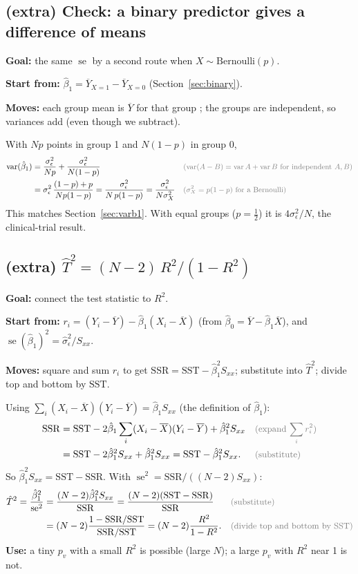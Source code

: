 \documentclass[11pt]{article}
\newcommand{\Var}{\operatorname{var}}
\newcommand{\se}{\operatorname{se}}
\newcommand{\Bern}{\text{Bernoulli}}
\newcommand{\SSR}{\mathrm{SSR}}
\newcommand{\SST}{\mathrm{SST}}
\newcommand{\Ybar}{\overline{Y}}
\newcommand{\Xbar}{\overline{X}}
\newcommand{\why}[1]{&&\text{\small\color{gray}(#1)}}
\newcommand{\mv}[1]{\tcbox[on line, colback=methodclr, colframe=methodclr, coltext=white, boxsep=0pt,
  left=2pt, right=2pt, top=1pt, bottom=1pt, arc=1.5pt]{\sffamily\scriptsize\bfseries M#1}}
\newcommand{\goal}[1]{\textbf{Goal:} #1\par}
\newcommand{\start}[1]{\textbf{Start from:} #1\par}
\newcommand{\moves}[1]{\textbf{Moves:} #1\par}
\begin{document}
\subsection{(extra) Check: a binary predictor gives a difference of means}\label{sec:binarycheck}
\begin{methodbox}
\goal{the same $\se$ by a second route when $X\sim\Bern(p)$.}
\start{$\hat\beta_1=\overline{Y}_{X=1}-\overline{Y}_{X=0}$ (Section~\ref{sec:binary}).}
\moves{each group mean is $\Ybar$ for that group \mv{7}; the groups are independent, so variances add \mv{4} (even though we subtract).}
\end{methodbox}
With $Np$ points in group 1 and $N(1-p)$ in group 0,
\begin{align*}
\Var(\hat\beta_1)&=\frac{\sigma_\epsilon^2}{Np}+\frac{\sigma_\epsilon^2}{N(1-p)} \why{$\Var(A-B)=\Var A+\Var B$ for independent $A,B$}\\
&=\sigma_\epsilon^2\,\frac{(1-p)+p}{Np(1-p)}=\frac{\sigma_\epsilon^2}{N\,p(1-p)}=\frac{\sigma_\epsilon^2}{N\sigma_X^2} \why{$\sigma_X^2=p(1-p)$ for a Bernoulli}
\end{align*}
This matches Section~\ref{sec:varb1}. With equal groups ($p=\frac12$) it is $4\sigma_\epsilon^2/N$, the clinical-trial result.

\subsection{(extra) $\hat T^2=(N-2)\,R^2/(1-R^2)$}\label{sec:tr2}
\begin{methodbox}
\goal{connect the test statistic to $R^2$.}
\start{$r_i=(Y_i-\Ybar)-\hat\beta_1(X_i-\Xbar)$ (from $\hat\beta_0=\Ybar-\hat\beta_1\Xbar$), and $\se(\hat\beta_1)^2=\hat\sigma_\epsilon^2/S_{xx}$.}
\moves{square and sum $r_i$ to get $\SSR=\SST-\hat\beta_1^2S_{xx}$; substitute into $\hat T^2$; divide top and bottom by $\SST$.}
\end{methodbox}
Using $\sum_i(X_i-\Xbar)(Y_i-\Ybar)=\hat\beta_1S_{xx}$ (the definition of $\hat\beta_1$):
\begin{align*}
\SSR&=\SST-2\hat\beta_1\sum_i(X_i-\Xbar)(Y_i-\Ybar)+\hat\beta_1^2S_{xx} \why{expand $\sum_ir_i^2$}\\
&=\SST-2\hat\beta_1^2S_{xx}+\hat\beta_1^2S_{xx}=\SST-\hat\beta_1^2S_{xx}. \why{substitute}
\end{align*}
So $\hat\beta_1^2S_{xx}=\SST-\SSR$. With $\se^2=\SSR/((N-2)S_{xx})$:
\begin{align*}
\hat T^2=\frac{\hat\beta_1^2}{\se^2}&=\frac{(N-2)\hat\beta_1^2S_{xx}}{\SSR}=\frac{(N-2)(\SST-\SSR)}{\SSR} \why{substitute}\\
&=(N-2)\frac{1-\SSR/\SST}{\SSR/\SST}=(N-2)\frac{R^2}{1-R^2}. \why{divide top and bottom by $\SST$}
\end{align*}
\textbf{Use:} a tiny $p_v$ with a small $R^2$ is possible (large $N$); a large $p_v$ with $R^2$ near 1 is not.
\end{document}
